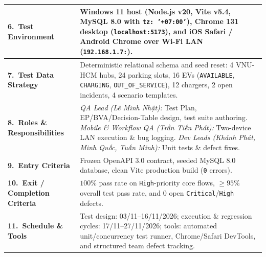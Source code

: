 \begin{table}[H]
\begin{tabularx}{\textwidth}{|L{3.5cm}|Y|}
    \hline
    \textbf{6.\ Test Environment} & Windows 11 host (Node.js v20, Vite v5.4, MySQL 8.0 with \texttt{tz: '+07:00'}), Chrome 131 desktop (\texttt{localhost:5173}), and iOS Safari / Android Chrome over Wi-Fi LAN (\texttt{192.168.1.7:}). \\
    \hline
    \textbf{7.\ Test Data Strategy} & Deterministic relational schema and seed reset: 4 VNU-HCM hubs, 24 parking slots, 16 EVs (\texttt{AVAILABLE}, \texttt{CHARGING}, \texttt{OUT\_\allowbreak OF\_\allowbreak SERVICE}), 12 chargers, 2 open incidents, 4 scenario templates. \\
    \hline
    \textbf{8.\ Roles \& Responsibilities} & \emph{QA Lead (Lê Minh Nhật):} Test Plan, EP/BVA/Decision-Table design, test suite authoring. \emph{Mobile \& Workflow QA (Trần Tiến Phát):} Two-device LAN execution \& bug logging. \emph{Dev Leads (Khánh Phát, Minh Quốc, Tuấn Minh):} Unit tests \& defect fixes. \\
    \hline
    \textbf{9.\ Entry Criteria} & Frozen OpenAPI 3.0 contract, seeded MySQL 8.0 database, clean Vite production build (\texttt{0} errors). \\
    \hline
    \textbf{10.\ Exit / Completion Criteria} & $100\%$ pass rate on \texttt{High}-priority core flows, $\ge 95\%$ overall test pass rate, and $0$ open \texttt{Critical}/\texttt{High} defects. \\
    \hline
    \textbf{11.\ Schedule \& Tools} & Test design: 03/11--16/11/2026; execution \& regression cycles: 17/11--27/11/2026; tools: automated unit/concurrency test runner, Chrome/Safari DevTools, and structured team defect tracking. \\
    \hline
  \end{tabularx}
\end{table}


